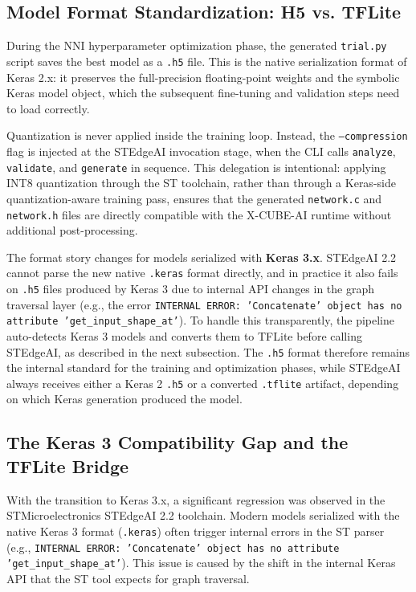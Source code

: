 \subsection{Model Format Standardization: H5 vs. TFLite}

During the NNI hyperparameter optimization phase, the generated \texttt{trial.py} script saves the best model as a \texttt{.h5} file. This is the native serialization format of Keras 2.x: it preserves the full-precision floating-point weights and the symbolic Keras model object, which the subsequent fine-tuning and validation steps need to load correctly.

Quantization is never applied inside the training loop. Instead, the \texttt{--compression} flag is injected at the STEdgeAI invocation stage, when the CLI calls \texttt{analyze}, \texttt{validate}, and \texttt{generate} in sequence. This delegation is intentional: applying INT8 quantization through the ST toolchain, rather than through a Keras-side quantization-aware training pass, ensures that the generated \texttt{network.c} and \texttt{network.h} files are directly compatible with the X-CUBE-AI runtime without additional post-processing.

The format story changes for models serialized with \textbf{Keras 3.x}. STEdgeAI 2.2 cannot parse the new native \texttt{.keras} format directly, and in practice it also fails on \texttt{.h5} files produced by Keras 3 due to internal API changes in the graph traversal layer (e.g., the error \texttt{INTERNAL ERROR: 'Concatenate' object has no attribute 'get\_input\_shape\_at'}). To handle this transparently, the pipeline auto-detects Keras 3 models and converts them to TFLite before calling STEdgeAI, as described in the next subsection. The \texttt{.h5} format therefore remains the internal standard for the training and optimization phases, while STEdgeAI always receives either a Keras 2 \texttt{.h5} or a converted \texttt{.tflite} artifact, depending on which Keras generation produced the model.

\subsection{The Keras 3 Compatibility Gap and the TFLite Bridge}

With the transition to Keras 3.x, a significant regression was observed in the STMicroelectronics STEdgeAI 2.2 toolchain. Modern models serialized with the native Keras 3 format (\texttt{.keras}) often trigger internal errors in the ST parser (e.g., \texttt{INTERNAL ERROR: 'Concatenate' object has no attribute 'get\_\allowbreak input\_\allowbreak shape\_\allowbreak at'}). This issue is caused by the shift in the internal Keras API that the ST tool expects for graph traversal.

